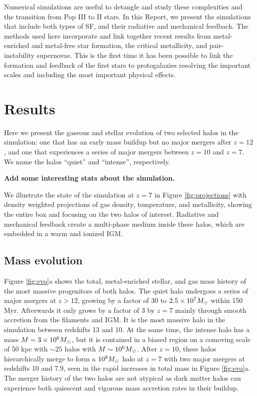 \documentclass[12pt]{article}
\newcommand{\Ms}{\ifmmode{M_\odot}\else{$M_\odot$}\fi}
\begin{document}
Numerical simulations are useful to detangle and study these
complexities and the transition from Pop III to II stars.  In this
Report, we present the simulations that include both types of SF, and
their radiative and mechanical feedback.  The methods used here
incorporate and link together recent results from metal-enriched and
metal-free star formation, the critical metallicity, and
pair-instability supernovae.  This is the first time it has been
possible to link the formation and feedback of the first stars to
protogalaxies resolving the important scales and including the most
important physical effects.

\section*{Results}
\label{sec:results}

Here we present the gaseous and stellar evolution of two selected
halos in the simulation: one that has an early mass buildup but no
major mergers after $z=12$, and one that experiences a series of major
mergers between $z=10$ and $z=7$.  We name the halos ``quiet'' and
``intense'', respectively. 

\textbf{Add some interesting stats about the simulation.}


We illustrate the state of the simulation at $z=7$ in Figure
\ref{fig:projections} with density weighted projections of gas
density, temperature, and metallicity, showing the entire box and
focusing on the two halos of interest.  Radiative and mechanical
feedback create a multi-phase medium inside these halos, which are
embedded in a warm and ionized IGM.

\subsection*{Mass evolution}
\label{sec:halo}


Figure \ref{fig:evo}a shows the total, metal-enriched stellar, and gas
mass history of the most massive progenitors of both halos.  The quiet
halo undergoes a series of major mergers at $z > 12$, growing by a
factor of 30 to $2.5 \times 10^7 \Ms$ within 150 Myr.  Afterwards it
only grows by a factor of 3 by $z=7$ mainly through smooth accretion
from the filaments and IGM.  It is the most massive halo in the
simulation between redshifts 13 and 10.  At the same time, the intense
halo has a mass $M = 3 \times 10^6 \Ms$, but it is contained in a
biased region on a comoving scale of 50 kpc with $\sim25$ halos with
$M \sim 10^6 \Ms$.  After $z=10$, these halos hierarchically merge to
form a $10^9 \Ms$ halo at $z=7$ with two major mergers at redshifts 10
and 7.9, seen in the rapid increases in total mass in Figure
\ref{fig:evo}a.  The merger history of the two halos are not atypical
as dark matter halos can experience both quiescent and vigorous mass
accretion rates in their buildup.
\end{document}
